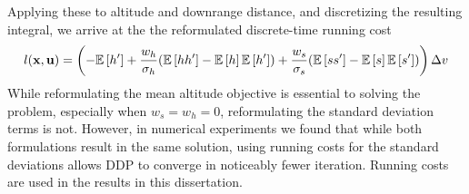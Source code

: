 Applying these to altitude and downrange distance, and discretizing the resulting integral, we arrive at the 
the reformulated discrete-time running cost
\begin{align}
	l(\mathbf{x},\mathbf{u}) = \left(-\mathbb{E}\left[h'\right] +  \frac{w_h}{\sigma_h}(\mathbb{E}\left[hh'\right]-\mathbb{E}\left[h\right]\mathbb{E}\left[h'\right]) + \frac{w_s}{\sigma_s}(\mathbb{E}\left[ss'\right]-\mathbb{E}\left[s\right]\mathbb{E}\left[s'\right])\right)\Delta v\label{Eq:ObjectiveReform}
\end{align}
While reformulating the mean altitude objective is essential to solving the problem, especially when $w_s=w_h=0$, reformulating the standard deviation terms is not. However, in numerical experiments we found that while both formulations result in the same solution, using running costs for the standard deviations allows DDP to converge in noticeably fewer iteration. Running costs are used in the results in this dissertation.

